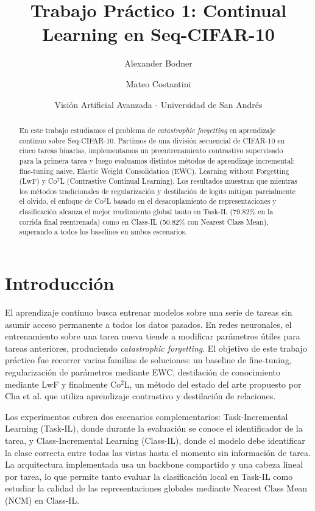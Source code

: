 \documentclass[10pt,a4paper]{article}
\title{\textbf{Trabajo Práctico 1: Continual Learning en Seq-CIFAR-10}}
\author{Alexander Bodner \and Mateo Costantini}
\date{Visión Artificial Avanzada - Universidad de San Andrés}
\begin{document}
\maketitle

\begin{abstract}
En este trabajo estudiamos el problema de \textit{catastrophic forgetting} en aprendizaje continuo sobre Seq-CIFAR-10. Partimos de una división secuencial de CIFAR-10 en cinco tareas binarias, implementamos un preentrenamiento contrastivo supervisado para la primera tarea y luego evaluamos distintos métodos de aprendizaje incremental: fine-tuning naive, Elastic Weight Consolidation (EWC), Learning without Forgetting (LwF) y Co$^2$L (Contrastive Continual Learning). Los resultados muestran que mientras los métodos tradicionales de regularización y destilación de logits mitigan parcialmente el olvido, el enfoque de Co$^2$L basado en el desacoplamiento de representaciones y clasificación alcanza el mejor rendimiento global tanto en Task-IL (79.82\% en la corrida final reentrenada) como en Class-IL (50.82\% con Nearest Class Mean), superando a todos los baselines en ambos escenarios.
\end{abstract}

\section{Introducción}

El aprendizaje continuo busca entrenar modelos sobre una serie de tareas sin asumir acceso permanente a todos los datos pasados. En redes neuronales, el entrenamiento sobre una tarea nueva tiende a modificar parámetros útiles para tareas anteriores, produciendo \textit{catastrophic forgetting}. El objetivo de este trabajo práctico fue recorrer varias familias de soluciones: un baseline de fine-tuning, regularización de parámetros mediante EWC, destilación de conocimiento mediante LwF y finalmente Co$^2$L, un método del estado del arte propuesto por Cha et al. que utiliza aprendizaje contrastivo y destilación de relaciones.

Los experimentos cubren dos escenarios complementarios: Task-Incremental Learning (Task-IL), donde durante la evaluación se conoce el identificador de la tarea, y Class-Incremental Learning (Class-IL), donde el modelo debe identificar la clase correcta entre todas las vistas hasta el momento sin información de tarea. La arquitectura implementada usa un backbone compartido y una cabeza lineal por tarea, lo que permite tanto evaluar la clasificación local en Task-IL como estudiar la calidad de las representaciones globales mediante Nearest Class Mean (NCM) en Class-IL.
\end{document}
